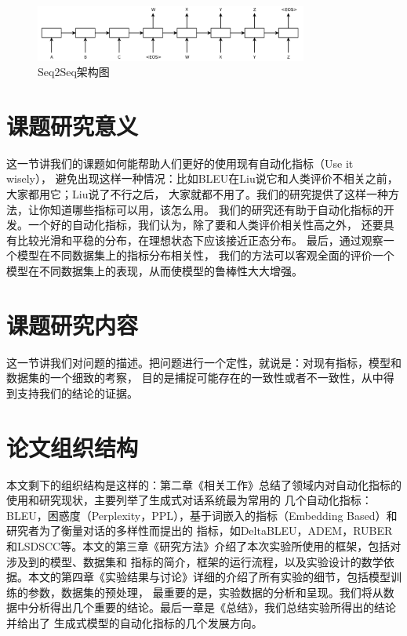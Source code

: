 \begin{figure}[H]
    \centering
    \includegraphics[width=0.8\textwidth]{figure/Seq2Seq.png}
    \caption{Seq2Seq架构图}
    \label{fig:Seq2Seq}
\end{figure}

\section{课题研究意义}\label{sec:课题研究意义}
这一节讲我们的课题如何能帮助人们更好的使用现有自动化指标（Use it wisely），
避免出现这样一种情况：比如BLEU在Liu说它和人类评价不相关之前，大家都用它；Liu说了不行之后，
大家就都不用了。我们的研究提供了这样一种方法，让你知道哪些指标可以用，该怎么用。
我们的研究还有助于自动化指标的开发。一个好的自动化指标，我们认为，除了要和人类评价相关性高之外，
还要具有比较光滑和平稳的分布，在理想状态下应该接近正态分布。
最后，通过观察一个模型在不同数据集上的指标分布相关性，
我们的方法可以客观全面的评价一个模型在不同数据集上的表现，从而使模型的鲁棒性大大增强。

\section{课题研究内容}\label{sec:课题研究内容}
这一节讲我们对问题的描述。把问题进行一个定性，就说是：对现有指标，模型和数据集的一个细致的考察，
目的是捕捉可能存在的一致性或者不一致性，从中得到支持我们的结论的证据。

\section{论文组织结构}\label{sec:论文组织结构}
本文剩下的组织结构是这样的：第二章《相关工作》总结了领域内对自动化指标的使用和研究现状，主要列举了生成式对话系统最为常用的
几个自动化指标：BLEU，困惑度（Perplexity，PPL），基于词嵌入的指标（Embedding Based）和研究者为了衡量对话的多样性而提出的
指标，如DeltaBLEU，ADEM，RUBER和LSDSCC等。本文的第三章《研究方法》介绍了本次实验所使用的框架，包括对涉及到的模型、数据集和
指标的简介，框架的运行流程，以及实验设计的数学依据。本文的第四章《实验结果与讨论》详细的介绍了所有实验的细节，包括模型训练的参数，数据集的预处理，
最重要的是，实验数据的分析和呈现。我们将从数据中分析得出几个重要的结论。最后一章是《总结》，我们总结实验所得出的结论并给出了
生成式模型的自动化指标的几个发展方向。
